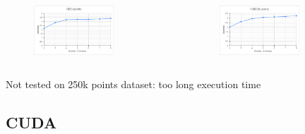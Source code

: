\documentclass[xcolor=table]{beamer}
\begin{document}
\begin{frame}
\begin{columns}[c]

\vspace{-0.5cm}

\begin{figure}
\includegraphics[width=0.7\textwidth]{img/chart_1000_points}
\end{figure}

\vspace{-0.5cm}

\begin{figure}
\includegraphics[width=0.7\textwidth]{img/chart_100000_points}
\end{figure}

\end{columns}

\vspace{0.4cm}
Not tested on 250k points dataset: too long execution time

\end{frame}


\subsection{CUDA}
\end{document}
